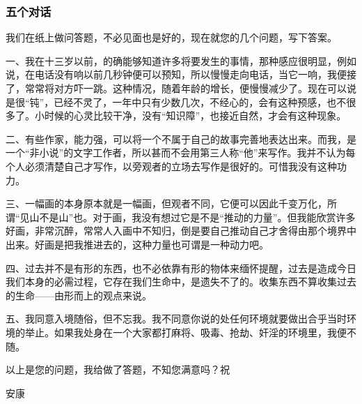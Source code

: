 \subsubsection{五个对话}


\par {}
\par 我们在纸上做问答题，不必见面也是好的，现在就您的几个问题，写下答案。
\par 一、我在十三岁以前，的确能够知道许多将要发生的事情，那种感应很明显，例如说，在电话没有响以前几秒钟便可以预知，所以慢慢走向电话，当它一响，我便接了，常常将对方吓一跳。这种情况，随着年龄的增长，便慢慢减少了。现在可以说是很“钝”，已经不灵了，一年中只有少数几次，不经心的，会有这种预感，也不很多了。小时候的心灵比较干净，没有“知识障”，也接近自然，才会有这种现象。
\par 二、有些作家，能力强，可以将一个不属于自己的故事完善地表达出来。而我，是一个“非小说”的文字工作者，所以甚而不会用第三人称“他”来写作。我并不认为每个人必须清楚自己才写作，以旁观者的立场去写作是很好的。可惜我没有这种功力。
\par 三、一幅画的本身原本就是一幅画，但观者不同，它便可以因此千变万化，所谓“见山不是山”也。对于画，我没有想过它是不是“推动的力量”。但我能欣赏许多好画，非常沉醉，常常人入画中不知归，倒是要自己推动自己才舍得由那个境界中出来。好画是把我推进去的，这种力量也可谓是一种动力吧。
\par 四、过去并不是有形的东西，也不必依靠有形的物体来缅怀提醒，过去是造成今日我们本身的必需过程，它存在我们生命中，是遗失不了的。收集东西不算收集过去的生命——由形而上的观点来说。
\par 五、我同意入境随俗，但不忘我。我不同意你说的处任何环境就要做出合乎当时环境的举止。如果我处身在一个大家都打麻将、吸毒、抢劫、奸淫的环境里，我便不随。
\par 以上是您的问题，我给做了答题，不知您满意吗？祝
\par 安康
\par {}


